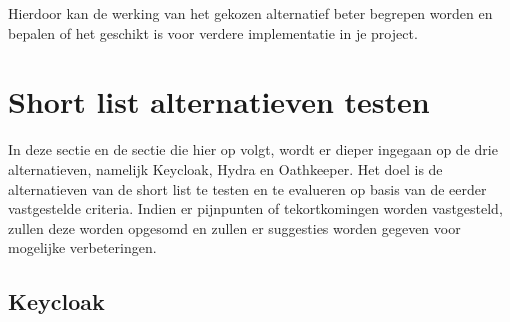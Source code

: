 Hierdoor kan de werking van het gekozen alternatief beter begrepen worden en bepalen of het geschikt is voor verdere implementatie in je project.


\section{Short list alternatieven testen}
\label{sec:short-list-alternatieven-testen}
In deze sectie en de sectie die hier op volgt, wordt er dieper ingegaan op de drie alternatieven, namelijk Keycloak, Hydra en Oathkeeper.
Het doel is de alternatieven van de short list te testen en te evalueren op basis van de eerder vastgestelde criteria. Indien er pijnpunten of tekortkomingen worden vastgesteld, zullen deze worden opgesomd en zullen er suggesties worden gegeven voor mogelijke verbeteringen.

\subsection{Keycloak}%
\label{subsec:keycloak}
